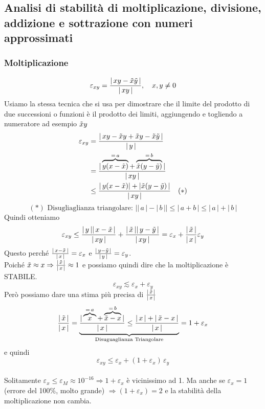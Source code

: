 \subsection{Analisi di stabilità di moltiplicazione, divisione,	addizione e sottrazione con numeri approssimati}
\subsubsection{Moltiplicazione}
\[ \varepsilon_{xy} = \frac{\lvert \, xy - \Tilde{x}\Tilde{y} \, \rvert}{\lvert \, xy \, \rvert}, \quad x , y \ne 0 \]
Usiamo la stessa tecnica che si usa per dimostrare che il limite del prodotto di due successioni o funzioni è il prodotto dei limiti, aggiungendo e togliendo a numeratore ad esempio $\Tilde{x}y$
\[\begin{split}
\varepsilon_{xy} & = \frac{\lvert \, xy - \Tilde{x}y + \Tilde{x}y - \Tilde{x}\Tilde{y} \, \rvert}{\lvert \, y \, \rvert} \\
& = \frac{\lvert \, \overbrace{y(x - \Tilde{x})}^{=\,a} + \overbrace{\Tilde{x}(y - \Tilde{y})}^{=\,b} \, \rvert}{\lvert\, xy \, \rvert} \\
& \le \frac{\lvert \, y(x - \Tilde{x}) \rvert + \lvert \Tilde{x}(y - \Tilde{y}) \, \rvert}{\lvert \, xy \, \rvert} \quad (*)
\end{split}\]
\[(*)\text{ Disugliaglianza triangolare: } \lvert \lvert \, a \, \rvert - \lvert \, b \, \rvert \rvert \le \lvert \, a + b \, \rvert \le \lvert \, a \, \rvert + \lvert \, b \, \rvert\]
Quindi otteniamo
\[ \varepsilon_{xy} \le \frac{\lvert \,y\, \rvert \lvert \,x - \Tilde{x}\, \rvert}{\lvert \,xy\, \rvert} + \frac{\lvert \,\Tilde{x}\, \rvert \lvert \,y - \Tilde{y}\, \rvert}{\lvert \,xy\, \rvert} = \varepsilon_x + \frac{\lvert \,\Tilde{x}\, \rvert}{\lvert \,x\, \rvert} \varepsilon_y\]
Questo perché $\frac{\lvert \,x - \Tilde{x}\, \rvert}{\lvert \,x\, \rvert} = \varepsilon_x$ e $\frac{\lvert \,y - \Tilde{y}\, \rvert}{\lvert \,y\, \rvert} = \varepsilon_y$.\\
Poiché $\Tilde{x} \approx x \Rightarrow \frac{\lvert \,\Tilde{x}\, \rvert}{\lvert \,x\, \rvert} \approx 1$ e possiamo quindi dire che la moltiplicazione è STABILE. 
\[\varepsilon_{xy} \lesssim \varepsilon_x + \varepsilon_y \]
Però possiamo dare una stima più precisa di  $\frac{\lvert \,\Tilde{x}\, \rvert}{\lvert \,x\, \rvert}$
\[ \frac{\lvert \,\Tilde{x}\, \rvert}{\lvert \,x\, \rvert} = \underbrace{ \frac{\lvert \, \overbrace{x}^{=\,a} + \overbrace{\Tilde{x} - x}^{=\,b} \, \rvert}{\lvert\, x \, \rvert} \le \frac{\lvert \, x \, \rvert + \lvert \,\Tilde{x} - x\, \rvert}{\lvert\, x \, \rvert}}_{\text{Disuguaglianza Triangolare}} = 1 + \varepsilon_x\]
e quindi \[ \varepsilon_{xy} \le \varepsilon_x + (1 + \varepsilon_x)\,\varepsilon_y\]\\
Solitamente $\varepsilon_x \le \varepsilon_M \approx 10^{-16} \Rightarrow 1 + \varepsilon_x$ è vicinissimo ad 1.
Ma anche se $\varepsilon_x = 1$ (errore del 100\%, molto grande) $\Rightarrow (1+\varepsilon_x)=2$ e la stabilità della moltiplicazione non cambia.
